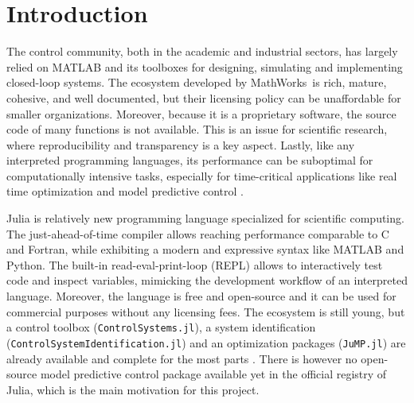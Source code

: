 \section{Introduction}

The control community, both in the academic and industrial sectors, has largely relied on MATLAB and its toolboxes for designing, simulating and implementing closed-loop systems. The ecosystem developed by MathWorks\texttrademark\ is rich, mature, cohesive, and well documented, but their licensing policy can be unaffordable for smaller organizations. Moreover, because it is a proprietary software, the source code of many functions is not available. This is an issue for scientific research, where reproducibility and transparency is a key aspect. Lastly, like any interpreted programming languages, its performance can be suboptimal for computationally intensive tasks, especially for time-critical applications like real time optimization and model predictive control \citep{matlabPythonJulia}.

Julia is relatively new programming language specialized for scientific computing. The just-ahead-of-time compiler allows reaching performance comparable to C and Fortran, while exhibiting a modern and expressive syntax like MATLAB and Python. The built-in read-eval-print-loop (REPL) allows to interactively test code and inspect variables, mimicking the development workflow of an interpreted language. Moreover, the language is free and open-source and it can be used for commercial purposes without any licensing fees. The ecosystem is still young, but a control toolbox (\texttt{ControlSystems.jl}), a system identification (\texttt{ControlSystemIdentification.jl}) and an optimization packages (\texttt{JuMP.jl}) are already available and complete for the most parts \citep{controlsystems_jl, jump_jl}. There is however no open-source model predictive control package available yet in the official registry of Julia, which is the main motivation for this project.

